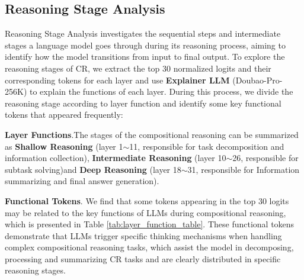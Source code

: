 \subsection{Reasoning Stage Analysis}
Reasoning Stage Analysis investigates the sequential steps and intermediate stages a language model goes through during its reasoning process, aiming to identify how the model transitions from input to final output.
To explore the reasoning stages of CR, we extract the top 30 normalized logits and their corresponding tokens for each layer and use \textbf{Explainer LLM} (Doubao-Pro-256K) to explain the functions of each layer. During this process, we divide the reasoning stage according to layer function and identify some key functional tokens that appeared frequently:

\textbf{Layer Functions}.The stages of the compositional reasoning can be summarized as \textbf{Shallow
Reasoning} (layer 1$\sim$11, responsible for task decomposition and information collection), \textbf{Intermediate
Reasoning} (layer 10$\sim$26, responsible for subtask solving)and \textbf{Deep
Reasoning} (layer 18$\sim$31, responsible for Information summarizing and final answer generation). 

\textbf{Functional Tokens}. We find that some tokens appearing in the top 30 logits may be related to the key functions of LLMs during compositional reasoning, which is presented in Table \ref{tab:layer_function_table}. These functional tokens demonstrate that LLMs trigger specific thinking mechanisms when handling complex compositional reasoning tasks, which assist the model in decomposing, processing and summarizing CR tasks and are clearly distributed in specific reasoning stages.